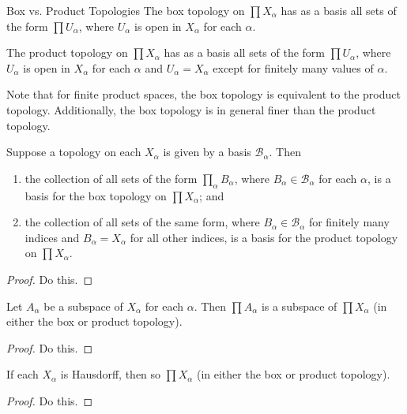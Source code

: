 \documentclass[10pt]{report}
\begin{document}
\begin{note}{Box vs. Product Topologies}{}
The box topology on $\prod X_{\alpha}$ has as a basis all sets of the form $\prod U_{\alpha}$, where $U_{\alpha}$ is open in $X_{\alpha}$ for each $\alpha$.

The product topology on $\prod X_{\alpha}$ has as a basis all sets of the form $\prod U_{\alpha}$, where $U_{\alpha}$ is open in $X_{\alpha}$ for each $\alpha$ and $U_{\alpha}=X_{\alpha}$ except for finitely many values of $\alpha$.
\end{note}

Note that for finite product spaces, the box topology is equivalent to the product topology. Additionally, the box topology is in general finer than the product topology.

\begin{thrm}{}{}
Suppose a topology on each $X_{\alpha}$ is given by a basis $\mathcal{B}_{\alpha}$. Then
\begin{enumerate}
	\item the collection of all sets of the form $\prod_{\alpha}B_{\alpha}$, where $B_{\alpha}\in \mathcal{B}_{\alpha}$ for each $\alpha$, is a basis for the box topology on $\prod X_{\alpha}$; and
	\item the collection of all sets of the same form, where $B_{\alpha}\in \mathcal{B}_{\alpha}$ for finitely many indices and $B_{\alpha}=X_{\alpha}$ for all other indices, is a basis for the product topology on $\prod X_{\alpha}$.
\end{enumerate}
\end{thrm}
\begin{proof}
{\color{red}Do this.}
\end{proof}

\begin{prop}
	Let $A_{\alpha}$ be a subspace of $X_{\alpha}$ for each $\alpha$. Then $\prod A_{\alpha}$ is a subspace of $\prod X_{\alpha}$ (in either the box or product topology).
\end{prop}
\begin{proof}
{\color{red}Do this.}
\end{proof}

\begin{prop}
	If each $X_{\alpha}$ is Hausdorff, then so $\prod X_{\alpha}$ (in either the box or product topology).
\end{prop}
\begin{proof}
{\color{red}Do this.}
\end{proof}
\end{document}
